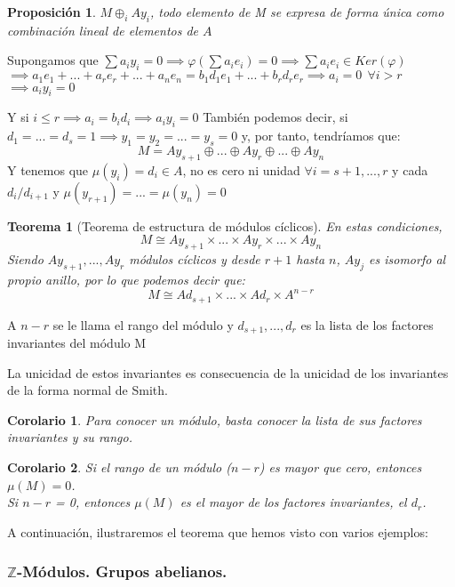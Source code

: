 \documentclass[11pt, a4paper, titlepage]{article}
\makeatletter
\renewenvironment{proof}[1][\proofname] {\vspace{-15pt}\par\pushQED{\qed}\normalfont\topsep6\p@\@plus6\p@\relax\trivlist\item[\hskip\labelsep\it#1\@addpunct{.}]\ignorespaces}{\popQED\endtrivlist\@endpefalse}
\providecommand{\ent}{\mathbb{Z}}
\theoremstyle{theorem-style}
\newtheorem*{nth}{Teorema}
\newtheorem*{nprop}{Proposición}
\newtheorem{ncor}{Corolario}
\theoremstyle{definition-style}
\theoremstyle{remark-style}
\theoremstyle{example-style}
\makeatother
\begin{document}
\begin{nprop}
	$M \oplus_i Ay_i$, todo elemento de M se expresa de forma única como combinación lineal de elementos de $A$
\end{nprop}
\begin{proof}
	Supongamos que $\sum a_i y_i = 0 \implies \varphi(\sum a_i e_i ) = 0 \implies \sum a_ie_i \in Ker (\varphi) $\\
	$\implies a_1e_1+...+ a_re_r+...+a_ne_n = b_1d_1e_1+...+b_rd_re_r \implies a_i = 0 \ \ \forall i > r$\\
	$\implies a_iy_i = 0$
	
	Y si $i \leq r\implies a_i = b_id_i \implies a_iy_i = 0$
\end{proof}
También podemos decir, si $d_1 = ... = d_s = 1 \implies y_1 = y_2 = ... = y_s = 0$ y, por tanto, tendríamos que:
\[
M = Ay_{s+1}  \oplus ... \oplus Ay_r \oplus ... \oplus Ay_n
\]
Y tenemos que $\mu(y_i) = d_i \in A$, no es cero ni unidad $\forall i = s+1,...,r$ y cada $d_i/d_{i+1}$ y $\mu(y_{r+1}) = ... =\mu(y_n) = 0$

\begin{nth}[Teorema de estructura de módulos cíclicos]
	En estas condiciones,
	\[
	M \cong Ay_{s+1} \times ... \times Ay_r \times ... \times Ay_n
	\]
	Siendo $Ay_{s+1},..., Ay_r$ módulos cíclicos y desde $r+1$ hasta $n$, $Ay_j$ es isomorfo al propio anillo, por lo que podemos decir que:
	\[
	M \cong Ad_{s+1}\times ... \times Ad_r \times A^{n-r}
	\]
\end{nth}

A $n-r$ se le llama el rango del módulo y $d_{s+1},...,d_r$ es la lista de los factores invariantes del módulo M

La unicidad de estos invariantes es consecuencia de la unicidad de los invariantes de la forma normal de Smith.

\begin{ncor}
	Para conocer un módulo, basta conocer la lista de sus factores invariantes y su rango.
\end{ncor}
\begin{ncor}
	Si el rango de un módulo ($n-r$) es mayor que cero, entonces $\mu(M) = 0$.\\
	
	Si $n-r$ = 0, entonces $\mu(M) $ es el mayor de los factores invariantes, el $d_r$.
\end{ncor}

A continuación, ilustraremos el teorema que hemos visto con varios ejemplos:

\subsubsection{$\ent$-Módulos. Grupos abelianos.}
\end{document}
